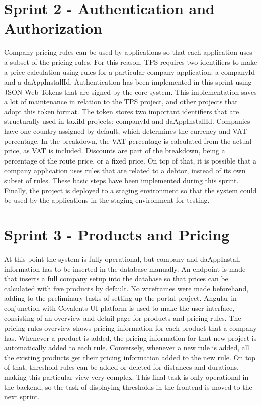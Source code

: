 \section{Sprint 2 - Authentication and Authorization}
Company pricing rules can be used by applications so that each application uses a subset of the pricing rules. For this reason, TPS requires two identifiers to make a price calculation using rules for a particular company application: a companyId and a daAppInstallId. Authentication has been implemented in this sprint using JSON Web Tokens that are signed by the core system. This implementation saves a lot of maintenance in relation to the TPS project, and other projects that adopt this token format. The token stores two important identifiers that are structurally used in taxiId projects: companyId and daAppInstallId. Companies have one country assigned by default, which determines the currency and VAT percentage. In the breakdown, the VAT percentage is calculated from the actual price, as VAT is included. Discounts are part of the breakdown, being a percentage of the route price, or a fixed price. On top of that, it is possible that a company application uses rules that are related to a debtor, instead of its own subset of rules. These basic steps have been implemented during this sprint. Finally, the project is deployed to a staging environment so that the system could be used by the applications in the staging environment for testing.

%
\section{Sprint 3 - Products and Pricing}
At this point the system is fully operational, but company and daAppInstall information has to be inserted in the database manually. An endpoint is made that inserts a full company setup into the database so that prices can be calculated with five products by default. No wireframes were made beforehand, adding to the preliminary tasks of setting up the portal project. Angular in conjunction with Covalents UI platform is used to make the user interface, consisting of an overview and detail page for products and pricing rules. The pricing rules overview shows pricing information for each product that a company has. Whenever a product is added, the pricing information for that new project is automatically added to each rule. Conversely, whenever a new rule is added, all the existing products get their pricing information added to the new rule. On top of that, threshold rules can be added or deleted for distances and durations, making this particular view very complex. This final task is only operational in the backend, so the task of displaying thresholds in the frontend is moved to the next sprint.

